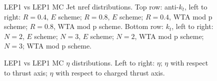 \begin{figure}[H]
\hfill
\caption{LEP1 vs LEP1 MC Jet nref distributions. Top row: anti-$k_t$, left to right: $R=0.4$, $E$ scheme; $R=0.8$, $E$ scheme; $R=0.4$, WTA mod p scheme; $R=0.8$, WTA mod p scheme. Bottom row: $k_t$, left to right: $N=2$, $E$ scheme; $N=3$, $E$ scheme; $N=2$, WTA mod p scheme; $N=3$; WTA mod p scheme.}  
\end{figure}

\begin{figure}[H]
\centering
{}\hfill
{}\hfill
{}\hfill
\caption{LEP1 vs LEP1 MC $\eta$ distributions. Left to right: $\eta$; $\eta$ with respect to thrust axis; $\eta$ with respect to charged thrust axis.}
\end{figure}

